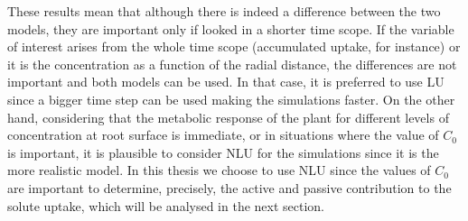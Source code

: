 




These results mean that although there is indeed a difference between the two models, they are important only if looked in a shorter time scope. 
If the variable of interest arises from the whole time scope (accumulated uptake, for instance) or it is the concentration as a function of the radial distance, the differences are not important and both models can be used. 
In that case, it is preferred to use LU since a bigger time step can be used making the simulations faster.
On the other hand, considering that the metabolic response of the plant for different levels of concentration at root surface is immediate, or in situations where the value of $C_0$ is important, it is plausible to consider NLU for the simulations since it is the more realistic model.  
In this thesis we choose to use NLU since the values of $C_0$ are important to determine, precisely, the active and passive contribution to the solute uptake, which will be analysed in the next section.

